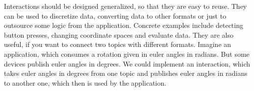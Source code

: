 Interactions should be designed generalized, so that they are easy to reuse. They can be used to discretize data, converting data to other formats or just to outsource some logic from the application. Concrete examples include detecting button presses, changing coordinate spaces and evaluate data.
They are also useful, if you want to connect two topics with different formats. Imagine an application, which consumes a rotation given in euler angles in radians. But some devices publish euler angles in degrees. We could implement an interaction, which takes euler angles in degrees from one topic and publishes euler angles in radians to another one, which then is used by the application.
